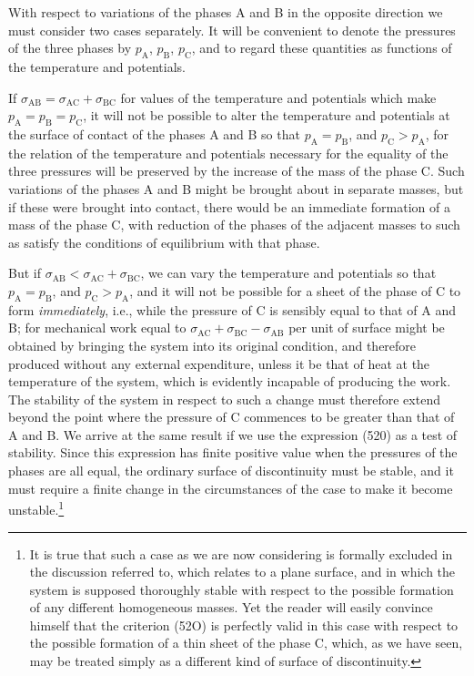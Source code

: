\documentclass[12pt]{article}
\begin{document}
{With respect to variations of the phases A and B in the opposite direction we must consider two cases separately. It will be convenient to denote the pressures of the three phases by $p_\text{A}$, $p_\text{B}$, $p_\text{C}$, and to regard these quantities as functions of the temperature and potentials.

If $\sigma_{\text{AB}} = \sigma_{\text{AC}} + \sigma_{\text{BC}}$ for values of the temperature and potentials which make $p_\text{A}=p_\text{B}=p_\text{C}$, it will not be possible to alter the temperature and potentials at the surface of contact of the phases A and B so that $p_\text{A}=p_\text{B}$, and $p_\text{C}>p_\text{A}$, for the relation of the temperature and potentials necessary for the equality of the three pressures will be preserved by the increase of the mass of the phase C. Such variations of the phases A and B might be brought about in separate masses, but if these were brought into contact, there would be an immediate formation of a mass of the phase C, with reduction of the phases of the adjacent masses to such as satisfy the conditions of equilibrium with that phase.

But if $\sigma_{\text{AB}} < \sigma_{\text{AC}} + \sigma_{\text{BC}}$, we can vary the temperature and potentials so that $p_\text{A}=p_\text{B}$, and $p_\text{C}>p_\text{A}$, and it will not be possible for a sheet of the phase of C to form \textit{immediately}, i.e., while the pressure of C is sensibly equal to that of A and B; for mechanical work equal to $\sigma_{\text{AC}} + \sigma_{\text{BC}} - \sigma_{\text{AB}}$ per unit of surface might be obtained by bringing the system into its original condition, and therefore produced without any external expenditure, unless it be that of heat at the temperature of the system, which is evidently incapable of producing the work. The stability of the system in respect to such a change must therefore extend beyond the point where the pressure of C commences to be greater than that of A and B. We arrive at the same result if we use the expression (520) as a test of stability. Since this expression has finite positive value when the pressures of the phases are all equal, the ordinary surface of discontinuity must be stable, and it must require a finite change in the circumstances of the case to make it become unstable.\footnote{It is true that such a case as we are now considering is formally excluded in the discussion referred to, which relates to a plane surface, and in which the system is supposed thoroughly stable with respect to the possible formation of any different homogeneous masses. Yet the reader will easily convince himself that the criterion (52O) is perfectly valid in this case with respect to the possible formation of a thin sheet of the phase C, which, as we have seen, may be treated simply as a different kind of surface of discontinuity.}

}
\end{document}
